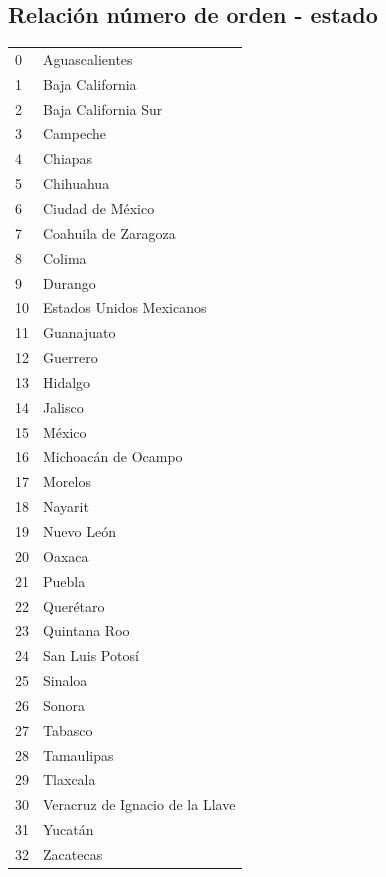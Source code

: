 \documentclass{article}
\begin{document}
\begin{table}
\subsection*{Relación número de orden - estado}
\begin{tabular}{ll}
0  & Aguascalientes                  \\
1  & Baja California                 \\
2  & Baja California Sur             \\
3  & Campeche                        \\
4  & Chiapas                         \\
5  & Chihuahua                       \\
6  & Ciudad de México                \\
7  & Coahuila de Zaragoza            \\
8  & Colima                          \\
9  & Durango                         \\
10 & Estados Unidos Mexicanos        \\
11 & Guanajuato                      \\
12 & Guerrero                        \\
13 & Hidalgo                         \\
14 & Jalisco                         \\
15 & México                          \\
16 & Michoacán de Ocampo             \\
17 & Morelos                         \\
18 & Nayarit                         \\
19 & Nuevo León                      \\
20 & Oaxaca                          \\
21 & Puebla                          \\
22 & Querétaro                       \\
23 & Quintana Roo                    \\
24 & San Luis Potosí                 \\
25 & Sinaloa                         \\
26 & Sonora                          \\
27 & Tabasco                         \\
28 & Tamaulipas                      \\
29 & Tlaxcala                        \\
30 & Veracruz de Ignacio de la Llave \\
31 & Yucatán                         \\
32 & Zacatecas                      
\end{tabular}
\end{table}

    
\end{document}
